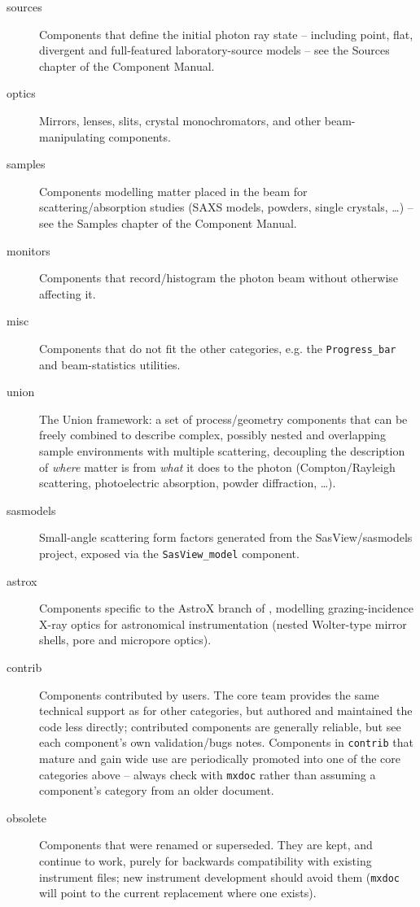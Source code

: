\begin{description}
\item[sources] Components that define the initial photon ray state --
  including point, flat, divergent and full-featured laboratory-source
  models -- see the Sources chapter of the Component Manual.
\item[optics] Mirrors, lenses, slits, crystal monochromators, and other
  beam-manipulating components.
\item[samples] Components modelling matter placed in the beam for
  scattering/absorption studies (SAXS models, powders, single crystals,
  \ldots) -- see the Samples chapter of the Component Manual.
\item[monitors] Components that record/histogram the photon beam without
  otherwise affecting it.
\item[misc] Components that do not fit the other categories, e.g. the
  \texttt{Progress\_bar} and beam-statistics utilities.
\item[union] The Union framework: a set of process/geometry components
  that can be freely combined to describe complex, possibly nested and
  overlapping sample environments with multiple scattering, decoupling
  the description of \emph{where} matter is from \emph{what} it does to
  the photon (Compton/Rayleigh scattering, photoelectric absorption,
  powder diffraction, \ldots).
\item[sasmodels] Small-angle scattering form factors generated from the
  SasView/sasmodels project, exposed via the \texttt{SasView\_model}
  component.
\item[astrox] Components specific to the AstroX branch of \MCX, modelling
  grazing-incidence X-ray optics for astronomical instrumentation (nested
  Wolter-type mirror shells, pore and micropore optics).
\item[contrib] Components contributed by \MCX users. The \MCX core team
  provides the same technical support as for other categories, but
  authored and maintained the code less directly; contributed components
  are generally reliable, but see each component's own validation/bugs
  notes. Components in \texttt{contrib} that mature and gain wide use are
  periodically promoted into one of the core categories above -- always
  check with \verb+mxdoc+ rather than assuming a component's category from
  an older document.
\item[obsolete] Components that were renamed or superseded. They are kept,
  and continue to work, purely for backwards compatibility with existing
  instrument files; new instrument development should avoid them
  (\verb+mxdoc+ will point to the current replacement where one exists).
\end{description}

